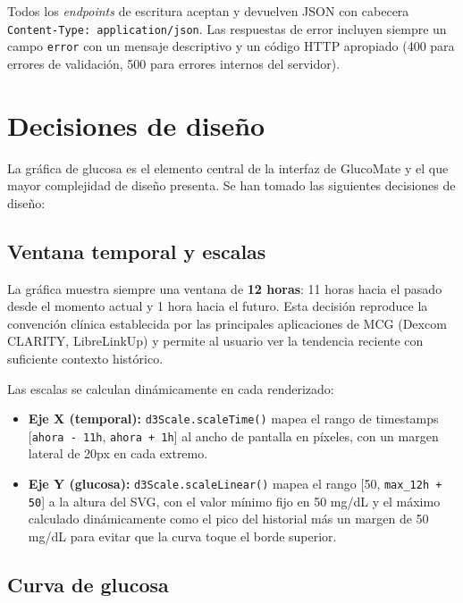 Todos los \textit{endpoints} de escritura aceptan y devuelven JSON con cabecera
\texttt{Content-Type: application/json}. Las respuestas de error incluyen siempre un
campo \texttt{error} con un mensaje descriptivo y un código HTTP apropiado (400 para
errores de validación, 500 para errores internos del servidor).

\section{Decisiones de diseño}
\label{sec:diseno-grafica}

La gráfica de glucosa es el elemento central de la interfaz de GlucoMate y el que
mayor complejidad de diseño presenta. Se han tomado las siguientes decisiones de diseño:

\subsection{Ventana temporal y escalas}
\label{subsec:ventana-temporal}

La gráfica muestra siempre una ventana de \textbf{12 horas}: 11 horas hacia el pasado
desde el momento actual y 1 hora hacia el futuro. Esta decisión reproduce la convención
clínica establecida por las principales aplicaciones de MCG (Dexcom CLARITY, LibreLinkUp)
y permite al usuario ver la tendencia reciente con suficiente contexto histórico.

Las escalas se calculan dinámicamente en cada renderizado:

\begin{itemize}
    \item \textbf{Eje X (temporal):} \texttt{d3Scale.scaleTime()} mapea el rango de
          timestamps [\texttt{ahora - 11h}, \texttt{ahora + 1h}] al ancho de pantalla
          en píxeles, con un margen lateral de 20px en cada extremo.

    \item \textbf{Eje Y (glucosa):} \texttt{d3Scale.scaleLinear()} mapea el rango
          [50, \texttt{max\_12h + 50}] a la altura del SVG, con el valor mínimo fijo
          en 50 mg/dL y el máximo calculado dinámicamente como el pico del historial
          más un margen de 50 mg/dL para evitar que la curva toque el borde superior.
\end{itemize}

\subsection{Curva de glucosa}
\label{subsec:curva}

